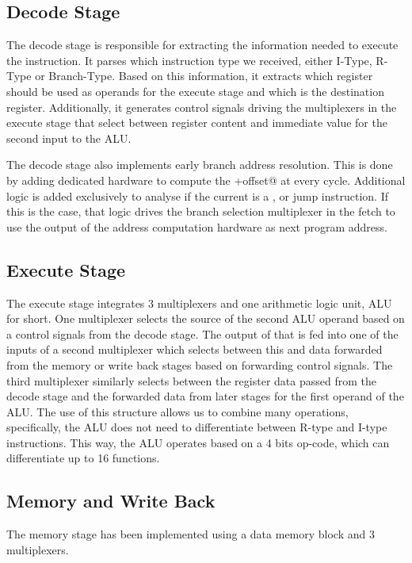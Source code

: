 \documentclass[12pt]{IEEEtran} %
\begin{document}
\subsection{Decode Stage} %
\label{sub:decode_stage}
The decode stage is responsible for extracting the information needed to execute the instruction. It parses which instruction type we received, either I-Type, R-Type or Branch-Type. Based on this information, it extracts which register should be used as operands for the execute stage and which is the destination register. Additionally, it generates control signals driving the multiplexers in the execute stage that select between register content and immediate value for the second input to the ALU. 

The decode stage also implements early branch address resolution. This is done by adding dedicated hardware to compute the \verb@base+offset@ at every cycle. Additional logic is added exclusively to analyse if the current is a \verb@BEQ@, \verb@BNE@ or jump instruction. If this is the case, that logic drives the branch selection multiplexer in the fetch to use the output of the address computation hardware as next program address.


\subsection{Execute Stage} %
\label{sub:execute_stage}
The execute stage integrates 3 multiplexers and one arithmetic logic unit, ALU for short. One multiplexer selects the source of the second ALU operand based on a control signals from the decode stage. The output of that is fed into one of the inputs of a second multiplexer which selects between this and data forwarded from the memory or write back stages based on forwarding control signals. The third multiplexer similarly selects between the register data passed from the decode stage and the forwarded data from later stages for the first operand of the ALU. The use of this structure allows us to combine many operations, specifically, the ALU does not need to differentiate between R-type and I-type instructions. This way, the ALU operates based on a 4 bits op-code, which can differentiate up to 16 functions. 

\subsection{Memory and Write Back} %
\label{sub:memory_and_write_back}
The memory stage has been implemented using a data memory block and 3 multiplexers.
\end{document}

